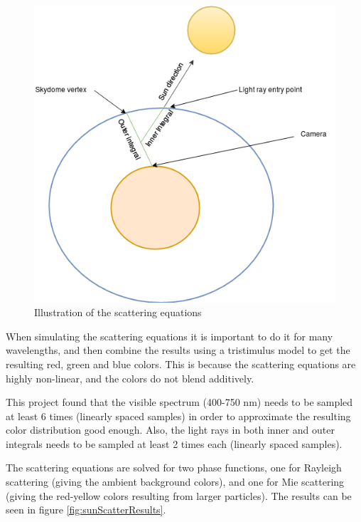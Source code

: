 \documentclass{article}
\begin{document}
\begin{figure}[H]
\centering
    \centering
    \includegraphics[scale=0.5]{scattering}
    \caption{Illustration of the scattering equations}
    \label{fig:scattering}
\end{figure}

When simulating the scattering equations it is important to do it for many wavelengths, and then combine the results
using a tristimulus model to get the resulting red, green and blue colors. This is because the scattering equations are highly non-linear, and the colors do not blend additively.

This project found that the visible spectrum (400-750 nm) needs to be sampled at least 6 times (linearly spaced samples) in order to approximate the resulting color distribution good enough.
Also, the light rays in both inner and outer integrals needs to be sampled at least 2 times each (linearly spaced samples).

The scattering equations are solved for two phase functions, one for Rayleigh scattering (giving the ambient background colors), and one for Mie scattering (giving the red-yellow colors resulting from larger particles).
The results can be seen in figure \ref{fig:sunScatterResults}.
\end{document}

